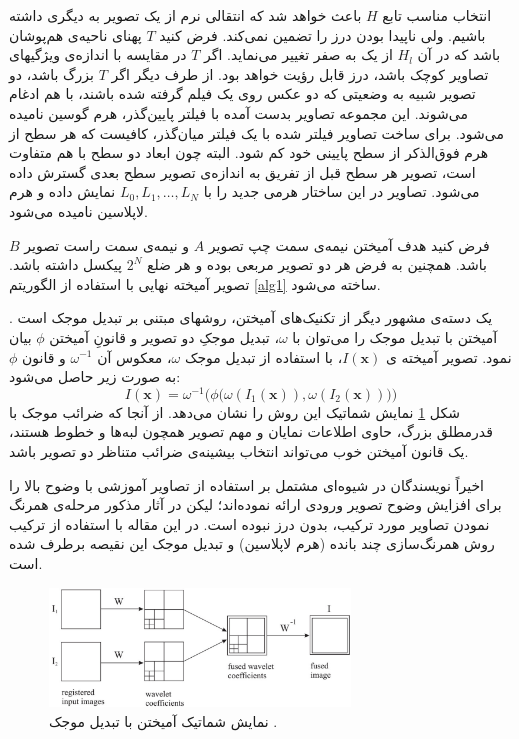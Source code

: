\documentclass[11pt,a4paper,twocolumn]{article}
\numberwithin{table}{section}
\begin{document}
انتخاب مناسب تابع $H$ باعث خواهد شد که انتقالی نرم از یک تصویر به دیگری داشته باشیم. ولی ناپیدا بودن درز را تضمین نمی‌کند. فرض کنید $T$ پهنای ناحیه‌ی هم‌پوشان باشد که در آن $H_l$ از یک به صفر تغییر می‌نماید. اگر $T$ در مقایسه با اندازه‌ی ویژگیهای تصاویر کوچک باشد، درز قابل رؤیت خواهد بود. از طرف دیگر اگر $T$ بزرگ باشد، دو تصویر شبیه به وضعیتی که دو عکس روی یک فیلم گرفته شده باشند، با هم ادغام می‌شوند. 
این مجموعه تصاویر بدست آمده با  فیلتر پایین‌گذر، هرم گوسین نامیده می‌شود. برای ساخت تصاویر فیلتر شده با یک فیلتر میان‌گذر، کافیست که هر سطح از هرم فوق‌الذکر از سطح پایینی خود کم شود. البته چون ابعاد دو سطح با هم متفاوت است، تصویر هر سطح قبل از تفریق به اندازه‌ی تصویر سطح بعدی گسترش داده می‌شود. تصاویر در این ساختار هرمی جدید را با $L_0,L_1,\dots,L_N$ نمایش داده و هرم لاپلاسین نامیده می‌شود. 

فرض کنید هدف آمیختن نیمه‌ی سمت چپ تصویر $A$ و نیمه‌ی سمت راست تصویر $B$ باشد. همچنین به فرض هر دو تصویر مربعی بوده و هر ضلع $2^N$ پیکسل داشته باشد. تصویر آمیخته نهایی با استفاده از الگوریتم \ref{alg1} ساخته می‌شود.

یک دسته‌ی مشهور دیگر از تکنیک‌های آمیختن، روشهای مبتنی بر تبدیل موجک است
 \cite{Hill02image,Nikolov01wavelets,Piella03thesis}.
آمیختن با تبدیل موجک را می‌توان با $\omega$، تبدیل موجکِ دو تصویر و قانونِ آمیختن $\phi$ بیان نمود.
تصویر آمیخته‌ ی $I(\mathbf{x})$، با استفاده از تبدیل موجک $\omega$، معکوس آن $\omega^{-1}$ و قانون $\phi$  به صورت زیر حاصل می‌شود:
\begin{equation}\label{eq:DWT_Fusion}
I(\mathbf{x})=\omega^{-1}\Big( \phi \big(
\omega(I_1(\mathbf{x})),\omega(I_2(\mathbf{x}))\big)\Big) \end{equation}
شکل \ref{fig:DWT_Fusion} نمایش شماتیک این روش را نشان می‌دهد. از آنجا که ضرائب موجک با قدرمطلق بزرگ، حاوی اطلاعات نمایان و مهم تصویر همچون لبه‌ها و خطوط هستند، یک قانون آمیختن خوب می‌تواند انتخاب بیشینه‌ی ضرائب متناظر دو تصویر باشد. 

اخیراً نویسندگان در \cite{Amintoosi08reconstruction,Amintoosi09regional} شیوه‌ای مشتمل بر استفاده از تصاویر آموزشی با وضوح بالا را برای افزایش وضوح تصویر ورودی ارائه نموده‌اند؛ لیکن در آثار مذکور مرحله‌ی همرنگ نمودن تصاویر مورد ترکیب، بدون درز نبوده است. در این مقاله با استفاده از ترکیب روش همرنگ‌سازی چند بانده
(هرم لاپلاسین) و تبدیل موجک این نقیصه برطرف شده است.

\begin{figure}[t]
\centering 
\includegraphics[width=80mm]{Images/DWT_Fusion.pdf}
\caption{نمایش شماتیک آمیختن با تبدیل موجک \cite{Nikolov01wavelets}.}\label{fig:DWT_Fusion}
\end{figure}
\end{document}
